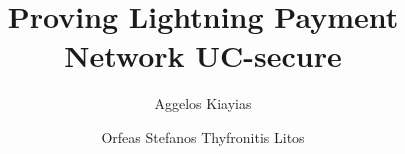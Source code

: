\title{Proving Lightning Payment Network UC-secure}
\author{Aggelos Kiayias \and Orfeas Stefanos Thyfronitis Litos}
\maketitle
